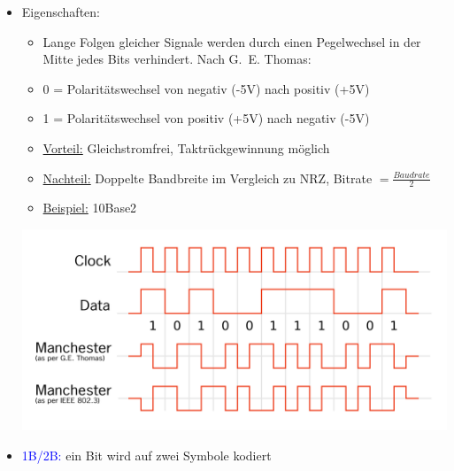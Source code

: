 \begin{itemize}
    \item Eigenschaften:
    \begin{itemize}
        \item Lange Folgen gleicher Signale werden durch einen Pegelwechsel in
        der Mitte jedes Bits verhindert.
        Nach G.\ E. Thomas:
        \item 0 = Polaritätswechsel von negativ (-5V) nach positiv (+5V)
        \item 1 = Polaritätswechsel von positiv (+5V) nach negativ (-5V)
        \item \underline{Vorteil:} Gleichstromfrei, Taktrückgewinnung möglich
        \item \underline{Nachteil:} Doppelte Bandbreite im Vergleich zu NRZ, Bitrate $= \frac{Baudrate}{2}$
        \item \underline{Beispiel:} 10Base2
    \end{itemize}
    \includegraphics[width=\textwidth]{img/Manchester-Code}
    \item \textcolor{blue}{1B/2B:} ein Bit wird auf zwei Symbole kodiert
\end{itemize}

